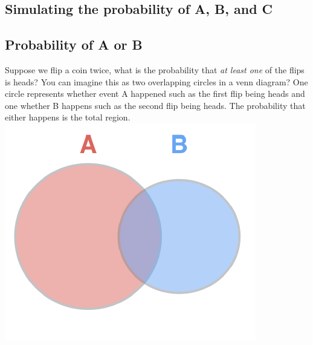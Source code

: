 \documentclass[]{article}
\newenvironment{Shaded}{\begin{snugshade}}{\end{snugshade}}
\newcommand{\CommentTok}[1]{\textcolor[rgb]{0.56,0.35,0.01}{\textit{#1}}}
\newcommand{\DecValTok}[1]{\textcolor[rgb]{0.00,0.00,0.81}{#1}}
\newcommand{\FloatTok}[1]{\textcolor[rgb]{0.00,0.00,0.81}{#1}}
\newcommand{\KeywordTok}[1]{\textcolor[rgb]{0.13,0.29,0.53}{\textbf{#1}}}
\newcommand{\NormalTok}[1]{#1}
\newcommand{\OperatorTok}[1]{\textcolor[rgb]{0.81,0.36,0.00}{\textbf{#1}}}
\newcommand{\StringTok}[1]{\textcolor[rgb]{0.31,0.60,0.02}{#1}}
\begin{document}
\hypertarget{simulating-the-probability-of-a-b-and-c}{%
\subsection{Simulating the probability of A, B, and
C}\label{simulating-the-probability-of-a-b-and-c}}

\begin{Shaded}
\end{Shaded}

\hypertarget{probability-of-a-or-b}{%
\subsection{Probability of A or B}\label{probability-of-a-or-b}}

Suppose we flip a coin twice, what is the probability that \emph{at
least one} of the flips is heads? You can imagine this as two
overlapping circles in a venn diagram? One circle represents whether
event A happened such as the first flip being heads and one whether B
happens such as the second flip being heads. The probability that either
happens is the total region.
\includegraphics{image-lib/probability_of_A_or_B.png}
\end{document}

